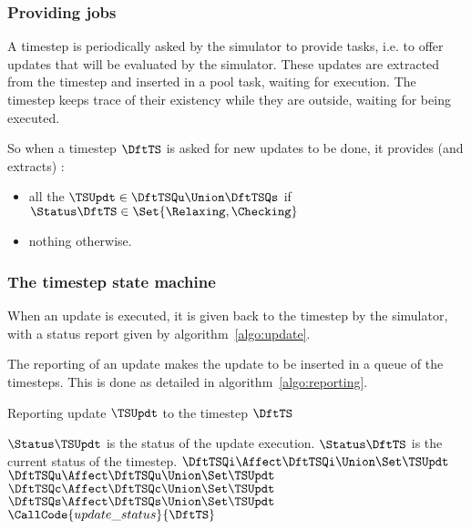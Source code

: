 \subsubsection{Providing jobs \label{sec:providejobs}}

A timestep is periodically asked by the simulator to provide tasks, i.e. to offer updates that will be evaluated by the simulator. These updates are extracted from the timestep and inserted in a pool task, waiting for execution. The timestep keeps trace of their existency while they are outside, waiting for being executed.

So when a timestep $\DftTS$ is asked for new updates to be done, it provides (and extracts) :
\begin{itemize}
\item all the $\TSUpdt \in \DftTSQu \Union \DftTSQs$ if $\Status\DftTS \in \Set{\Relaxing, \Checking}$
\item nothing otherwise.
\end{itemize}


\subsubsection{The timestep state machine}

When an update is executed, it is given back to the timestep by the simulator, with a status report given by algorithm~\ref{algo:update}.

The reporting of an update makes the update to be inserted in a queue of the timesteps. This is done as detailed in algorithm~\ref{algo:reporting}.


\begin{algorithm}
  \caption{Reporting update $\TSUpdt$ to the timestep $\DftTS$\label{algo:reporting}}
  \begin{algorithmic}[1]
    \REQUIRE $\Status\TSUpdt$ is the status of the update execution.
    \REQUIRE $\Status\DftTS$ is the current status of the timestep.
    \IF    {$\Status\TSUpdt = \Impossible$} \STATE $\DftTSQi \Affect \DftTSQi \Union \Set\TSUpdt$
    \ELSIF {$\Status\TSUpdt = \Updated$}    \STATE $\DftTSQu \Affect \DftTSQu \Union \Set\TSUpdt$
    \ELSIF {$\Status\TSUpdt = \Done$}       \STATE {}
    \ELSIF {$\Status\TSUpdt = \UpToDate$}
    \STATE $\DftTSQc \Affect \DftTSQc \Union \Set\TSUpdt$
    \ELSE
    \STATE $\DftTSQs \Affect \DftTSQs \Union \Set\TSUpdt$
    \ENDIF
    \ENDIF
    \STATE $\CallCode{update\_status}{\DftTS}$ 
  \end{algorithmic}
\end{algorithm}

